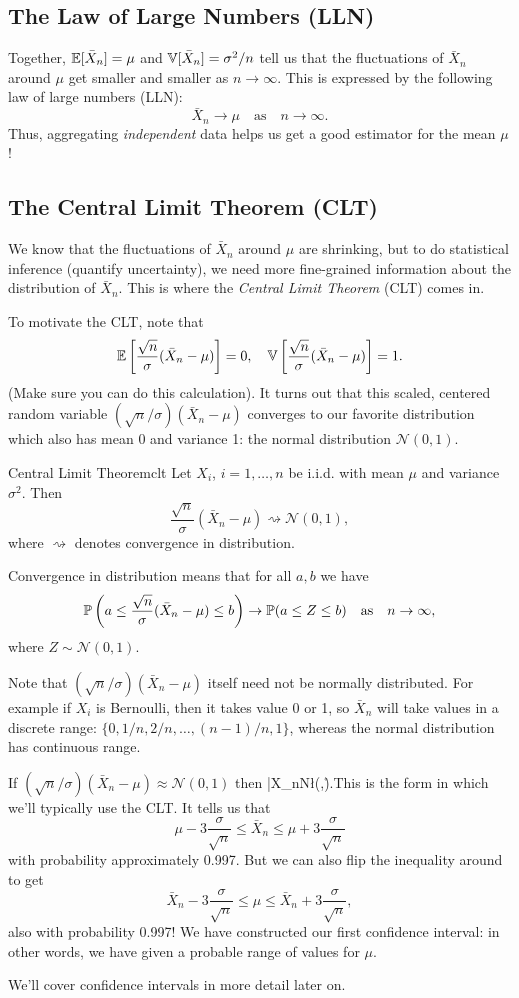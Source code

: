 \documentclass[11pt]{article}
\begin{document}
\subsection{The Law of Large Numbers (LLN)} Together, $\mathbb E[\bar X_n]=\mu$ and $\mathbb V[\bar X_n]=\sigma^2/n$ tell us that the fluctuations of $\bar X_n$ around $\mu$ get smaller and smaller as $n\to\infty$. This is expressed by the following law of large numbers (LLN):
$$\bar X_n\to\mu\quad\text{as}\quad n\to\infty.$$
Thus, aggregating \emph{independent} data helps us get a good estimator for the mean $\mu$!
\subsection{The Central Limit Theorem (CLT)} We know that the fluctuations of $\bar X_n$ around $\mu$ are shrinking, but to do statistical inference (quantify uncertainty), we need more fine-grained information about the distribution of $\bar X_n$. This is where the \emph{Central Limit Theorem} (CLT) comes in. 

To motivate the CLT, note that 
$$\mathbb E\left[\frac{\sqrt n}{\sigma}(\bar X_n - \mu)\right]=0,\quad \mathbb V\left[\frac{\sqrt n}{\sigma}(\bar X_n - \mu)\right]=1.$$ (Make sure you can do this calculation). It turns out that this scaled, centered random variable $(\sqrt n/\sigma)(\bar X_n-\mu)$ converges to our favorite distribution which also has mean 0 and variance 1: the normal distribution $\mathcal N(0,1)$. 
\begin{thm}{Central Limit Theorem}{clt}
Let $X_i$, $i=1,\dots,n$ be i.i.d. with mean $\mu$ and variance $\sigma^2$. Then
$$\frac{\sqrt n}{\sigma}(\bar X_n - \mu)\rightsquigarrow\mathcal N(0, 1),$$ where $\rightsquigarrow$ denotes convergence in distribution.
\end{thm}
\noindent Convergence in distribution means that for all $a,b$ we have
$$\mathbb P\left(a\leq\frac{\sqrt n}{\sigma}(\bar X_n - \mu)\leq b\right)\to\mathbb P(a\leq Z\leq b)\quad\text{as}\quad n\to\infty,$$ where $Z\sim\mathcal N(0,1)$.
\begin{remark}
Note that $(\sqrt n/\sigma)(\bar X_n-\mu)$ itself need not be normally distributed. For example if $X_i$ is Bernoulli, then it takes value 0 or 1, so $\bar X_n$ will take values in a discrete range: $\{0, 1/n, 2/n,\dots, (n-1)/n, 1\}$, whereas the normal distribution has continuous range. 
\end{remark}
\begin{remark}
If $(\sqrt n/\sigma)(\bar X_n - \mu)\approx\mathcal N(0, 1)$ then \beq\label{CLT2}\bar X_n\approx\mathcal N\l(\mu,\r).\eeq This is the form in which we'll typically use the CLT. It tells us that
$$\mu-3\frac{\sigma}{\sqrt n}\leq \bar X_n \leq \mu+3\frac{\sigma}{\sqrt n}$$ with probability approximately 0.997. But we can also flip the inequality around to get
$$\bar X_n-3\frac{\sigma}{\sqrt n}\leq \mu \leq \bar X_n+3\frac{\sigma}{\sqrt n},$$ also with probability 0.997! We have constructed our first confidence interval: in other words, we have given a probable range of values for $\mu$.

We'll cover confidence intervals in more detail later on.
\end{remark}
\end{document}

